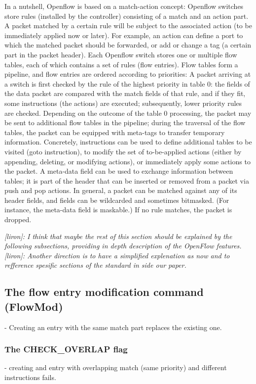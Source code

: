\documentclass[conference]{sigcomm-alternate}
\newcommand{\liron}[1]{\textit{\textcolor{mygreen}{[liron]: #1}}} %
\begin{document}
In a nutshell,
Openflow
is based on a match-action concept: Openflow switches store
rules (installed by the controller) consisting of a match and an
action part. A packet matched by a certain rule will be subject
to the associated action (to be immediately applied now or later).
For example, an action can define a port to which the
matched packet should be forwarded, or add or change a tag
(a certain part in the packet header).
Each Openflow switch stores one or multiple flow tables,
each of which contains a set of rules (flow entries). Flow
tables form a pipeline, and flow entries are ordered according
to priorities: A packet arriving at a switch is first checked by
the rule of the highest priority in table 0: the fields of the
data packet are compared with the match fields of that rule,
and if they fit, some instructions (the actions) are executed;
subsequently, lower priority rules are checked. Depending on
the outcome of the table 0 processing, the packet may be sent
to additional flow tables in the pipeline; during the traversal of
the flow tables, the packet can be equipped with meta-tags to
transfer temporary information. Concretely, instructions can be
used to define additional tables to be visited (goto instruction),
to modify the set of to-be-applied actions (either by appending,
deleting, or modifying actions), or immediately apply some
actions to the packet. A meta-data field can be used to exchange
information between tables; it is part of the header that can be
inserted or removed from a packet via push and pop actions.
In general, a packet can be matched against any of its header
fields, and fields can be wildcarded and sometimes bitmasked.
(For instance, the meta-data field is maskable.) If no rule
matches, the packet is dropped.

\liron{I think that maybe the rest of this section should be explained by the following subsections, providing in depth description of the OpenFlow features.}
\liron{Another direction is to have a simplified explenation as now and to refference spesific sections of the standard in side our paper.}
\subsection{The flow entry modification command (FlowMod)}
- Creating an entry with the same match part replaces the existing one.

\subsubsection{The CHECK\_OVERLAP flag}
- creating and entry with overlapping match (same priority) and different instructions fails.
\end{document}
